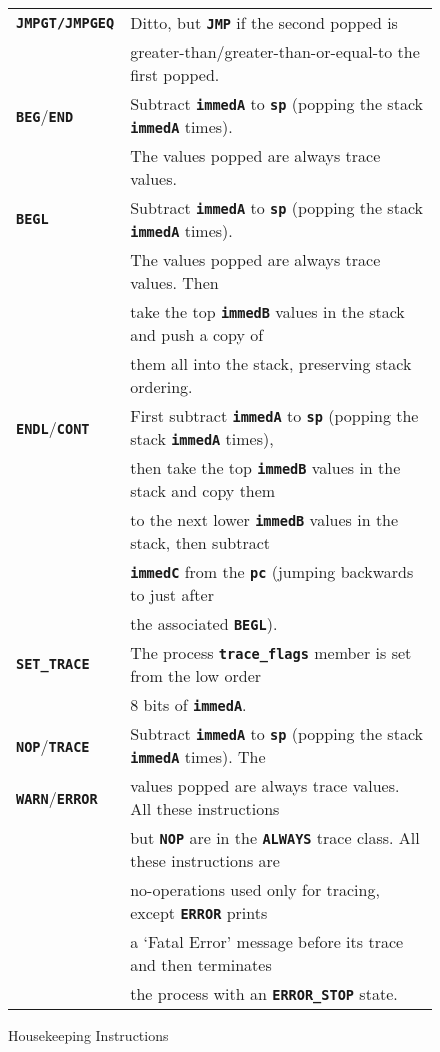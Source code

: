 \documentclass[12pt]{article}
\newcommand{\TT}[1]{{\tt \bfseries #1}}
\newlength{\figurewidth}
\newenvironment{boxedfigure}[1][!btp]%
	{\begin{figure*}[#1]
	 \begin{lrbox}{\figurebox}
	 \begin{minipage}{\figurewidth}

	 \vspace*{1ex}}%
	{
	 \vspace*{1ex}

	 \end{minipage}
	 \end{lrbox}

	 \centering
	 \fbox{\hspace*{0.1in}\usebox{\figurebox}\hspace*{0.1in}}
	 \end{figure*}}
\begin{document}
\begin{boxedfigure}
\begin{center}
\begin{tabular}{|l|l|}
\TT{JMPGT/JMPGEQ}
    & Ditto, but \TT{JMP} if the second popped is \\
    & greater-than/greater-than-or-equal-to the first popped.
\\\hline
\TT{BEG}/\TT{END}
    & Subtract \TT{immedA} to \TT{sp} (popping the stack \TT{immedA} times). \\
    & The values popped are always trace values.
\\\hline
\TT{BEGL}
    & Subtract \TT{immedA} to \TT{sp} (popping the stack \TT{immedA} times). \\
    & The values popped are always trace values.  Then \\
    & take the top \TT{immedB} values in the stack and push a copy of \\
    & them all into the stack, preserving stack ordering.
\\\hline
\TT{ENDL}/\TT{CONT}
    & First subtract \TT{immedA} to \TT{sp}
      (popping the stack \TT{immedA} times), \\
    & then take the top \TT{immedB} values in the stack and copy them \\
    & to the next lower \TT{immedB} values in the stack, then subtract \\
    & \TT{immedC} from the \TT{pc} (jumping backwards to just after \\
    & the associated \TT{BEGL}).
\\\hline
\TT{SET\_TRACE}
    & The process \TT{trace\_flags} member is set from the low order \\
    & 8 bits of \TT{immedA}.
\\\hline
\TT{NOP}/\TT{TRACE}
    & Subtract \TT{immedA} to \TT{sp} (popping the stack \TT{immedA} times).
      The \\
\TT{WARN}/\TT{ERROR}
    & values popped are always trace values.  All these instructions \\
    & but \TT{NOP} are in the \TT{ALWAYS} trace class.  All these instructions
      are \\
    & no-operations used only for tracing, except \TT{ERROR} prints \\
    & a `Fatal Error' message before its trace and then terminates \\
    & the process with an \TT{ERROR\_STOP} state.
\\\hline
\end{tabular}
\end{center}
\vspace*{-3ex}
\caption{Housekeeping Instructions}
\label{HOUSEKEEPING-INSTRUCTIONS}
\end{boxedfigure}
\end{document}
